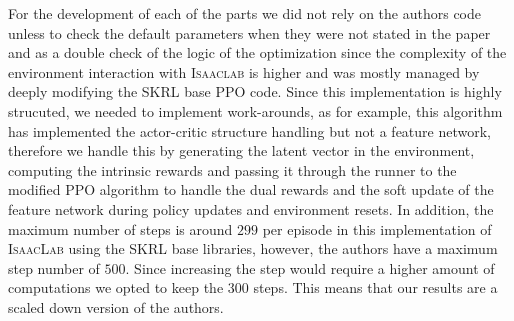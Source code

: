 \documentclass[10pt]{article} %
\begin{document}
For the development of each of the parts we did not rely on the authors code unless to check the default parameters when they were not stated in the paper and as a double check of the logic of the optimization since the complexity of the environment interaction with \textsc{Isaaclab} is higher and was mostly managed by deeply modifying the SKRL base \textsc{PPO} code. Since this implementation is highly strucuted, we needed to implement work-arounds, as for example, this algorithm has implemented the actor-critic structure handling but not a feature network, therefore we handle this by generating the latent vector in the environment, computing the intrinsic rewards and passing it through the runner to the modified \textsc{PPO} algorithm to handle the dual rewards and the soft update of the feature network during policy updates and environment resets. In addition, the maximum number of steps is around $299$ per episode in this implementation of \textsc{IsaacLab} using the SKRL base libraries, however, the authors have a maximum step number of $500$. Since increasing the step would require a higher amount of computations we opted to keep the $300$ steps. This means that our results are a scaled down version of the authors.
\end{document}
